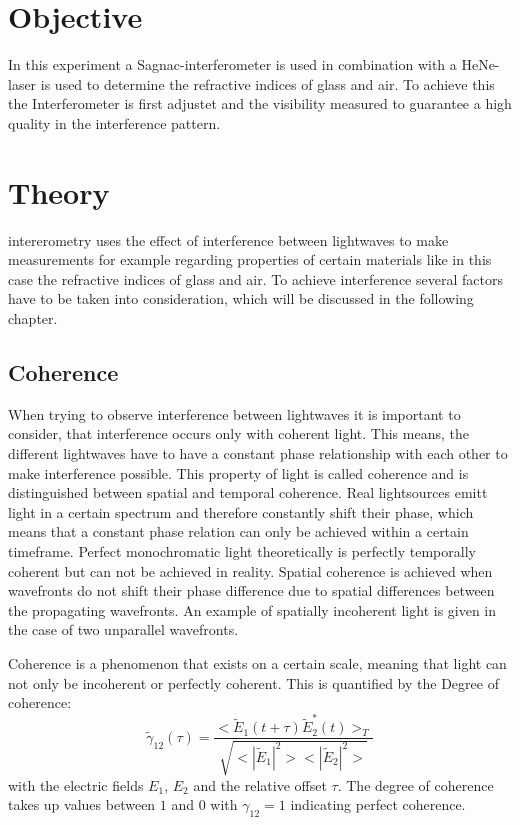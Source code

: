 \section{Objective}
In this experiment a Sagnac-interferometer is used in combination with a HeNe-laser is used to determine the refractive indices of glass and air. To achieve this the Interferometer is first adjustet and the visibility measured to guarantee a high quality in the interference pattern.
\section{Theory}
\label{sec:Theorie}
intererometry uses the effect of interference between lightwaves to make measurements for example regarding properties of certain materials like in this case the refractive indices of glass and air. To achieve interference several factors have to be taken into consideration, which will be discussed in the following chapter.
\subsection{Coherence}
When trying to observe interference between lightwaves it is important to consider, that interference occurs only with coherent light. This means, the different lightwaves have to have a constant phase relationship with each other to make interference possible. This property of light is called coherence and is distinguished between spatial and temporal coherence. Real lightsources emitt light in a certain spectrum and therefore constantly shift their phase, which means that a constant phase relation can only be achieved within a certain timeframe. Perfect monochromatic light theoretically is perfectly temporally coherent but can not be achieved in reality. Spatial coherence is achieved when wavefronts do not shift their phase difference due to spatial differences between the propagating wavefronts. An example of spatially incoherent light is given in the case of two unparallel wavefronts. 

Coherence is a phenomenon that exists on a certain scale, meaning that light can not only be incoherent or perfectly coherent. This is quantified by the Degree of coherence:
\begin{equation}
 \tilde{\gamma}_{12}(\tau)=\frac{\bigl<\tilde{E}_1(t+\tau)\tilde{E}^*_2(t)\bigr>_T}{\sqrt{\bigl<|\tilde{E}_1|^2\bigr>\bigl<|\tilde{E}_2|^2\bigr>}}
\end{equation}
with the electric fields $E_1$, $E_2$ and the relative offset $\tau$. The degree of coherence takes up values between $1$ and $0$ with $\gamma_{12}=1$ indicating perfect coherence.

